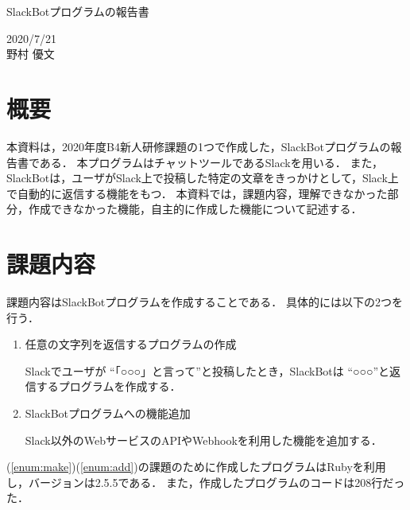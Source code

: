 \documentclass[12pt]{jsarticle}
\begin{document}
\begin{center}
{\LARGE SlackBotプログラムの報告書}
\end{center}

\begin{flushright}
  2020/7/21\\
  野村 優文
\end{flushright}

\section{概要}
\label{sec:introduction}
本資料は，2020年度B4新人研修課題の1つで作成した，SlackBotプログラムの報告書である．
本プログラムはチャットツールであるSlack\cite{Slack}を用いる．
また，SlackBotは，ユーザがSlack上で投稿した特定の文章をきっかけとして，Slack上で自動的に返信する機能をもつ．
本資料では，課題内容，理解できなかった部分，作成できなかった機能，自主的に作成した機能について記述する．

\section{課題内容}\label{sec:content}
課題内容はSlackBotプログラムを作成することである．
具体的には以下の2つを行う．

\begin{enumerate}
\item\label{enum:make} 任意の文字列を返信するプログラムの作成

  Slackでユーザが ``「○○○」と言って''と投稿したとき，SlackBotは ``○○○''と返信するプログラムを作成する．
  
\item\label{enum:add} SlackBotプログラムへの機能追加

  Slack以外のWebサービスのAPIやWebhookを利用した機能を追加する．
\end{enumerate}
(\ref{enum:make})(\ref{enum:add})の課題のために作成したプログラムはRubyを利用し，バージョンは2.5.5である．
また，作成したプログラムのコードは208行だった．
\end{document}

